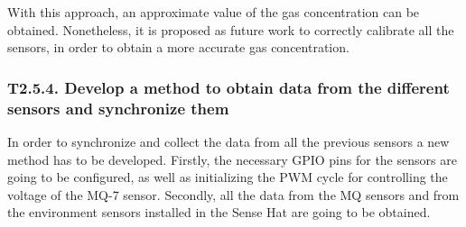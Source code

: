 

With this approach, an approximate value of the gas concentration can be obtained. Nonetheless, it is proposed as future work to correctly calibrate all the sensors, in order to obtain a more accurate gas concentration.


\subsubsection{T2.5.4. Develop a method to obtain data from the different sensors and synchronize them}

In order to synchronize and collect the data from all the previous sensors a new method has to be developed. Firstly, the necessary GPIO pins for the sensors are going to be configured, as well as initializing the \ac{PWM} cycle for controlling the voltage of the MQ-7 sensor. Secondly, all the data from the MQ sensors and from the environment sensors installed in the Sense Hat \cite{SenseHAT} are going to be obtained.

